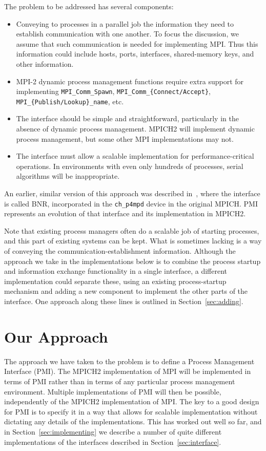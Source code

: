 \documentclass[11pt]{article}
\begin{document}
The problem to be addressed has several components:
\begin{itemize}
\item Conveying to processes in a parallel job the information they need
  to establish communication with one another.  To focus the discussion,
  we assume that such communication is needed for implementing MPI.
  Thus this information could include hosts, ports, interfaces,
  shared-memory keys, and other information.
\item MPI-2 dynamic process management functions require extra support
  for implementing {\tt MPI\_Comm\_Spawn}, {\tt MPI\_Comm\_\{Connect/Accept\}},
  {\tt MPI\_\{Publish/Lookup\}\_name}, etc.
\item The interface should be simple and straightforward, particularly
  in the absence of dynamic process management.  MPICH2 will implement
  dynamic process management, but some other MPI implementations may
  not.
\item The interface must allow a scalable implementation for
  performance-critical operations.  In environments with even only hundreds
  of processes, serial algorithms will be inappropriate.
\end{itemize}
An earlier, similar version of this approach was described
in~\cite{butler-lusk-gropp:mpd-parcomp}, where the interface is called
BNR, incorporated in the {\tt ch\_p4mpd} device in the original MPICH.  PMI
represents an evolution of that interface and its implementation in MPICH2.

Note that existing process managers often do a scalable job of starting
processes, and this part of existing systems can be kept.  What is
sometimes lacking is a way of conveying the communication-establishment
information.  Although the approach we take in the implementations below
is to combine the process startup and information exchange functionality
in a single interface, a different implementation could separate these,
using an existing process-startup mechanism and adding a new component
to implement the other parts of the interface.  One approach along these
lines is outlined in Section~\ref{sec:adding}.

\section{Our Approach}
\label{sec:approach}

The approach we have taken to the problem is to define a Process
Management Interface (PMI).  The MPICH2 implementation of MPI will be
implemented in terms of PMI rather than in terms of any particular
process management environment.  Multiple implementations of PMI will
then be possible, independently of the MPICH2 implementation of MPI.
The key to a good design for PMI is to specify it in a way that allows for
scalable implementation without dictating any details of the
implementations.  This has worked out well so far, and in
Section~\ref{sec:implementing} we describe a number of quite different
implementations of the interfaces described in Section~\ref{sec:interface}.
\end{document}

